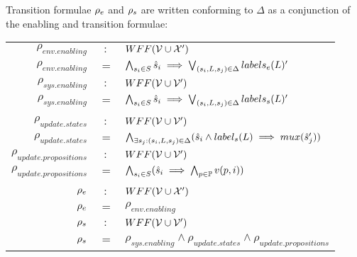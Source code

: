 Transition formulae ${\rho_e}$ and ${\rho_s}$ are written conforming to $\Delta$ as a conjunction of the enabling and transition formulae:

\vspace{1em}
\begin{tabular}{ r c l }
	$\rho_{env.enabling}$&$:$&$WFF({\mathcal{V}} \cup {\ensuremath{\mathcal{X}}}')$\\
	$\rho_{env.enabling}$ &$=$& $\bigwedge_{s_i \in S} \hat{s}_{i} \implies \bigvee_{(s_i,L,s_j) \in \Delta}labels_e(L)'$\\
	$\rho_{sys.enabling}$&$:$&$WFF({\mathcal{V}} \cup {\ensuremath{\mathcal{V}}}')$\\
	$\rho_{sys.enabling}$ &$=$& $\bigwedge_{s_i \in S} \hat{s}_{i} \implies \bigvee_{(s_i,L,s_j) \in \Delta}labels_s(L)'$\\
	&&\\
	$\rho_{update.states}$&$:$&$WFF({\mathcal{V}} \cup {\ensuremath{\mathcal{V}}}')$\\
$\rho_{update.states}$&$=$&$\bigwedge_{\exists s_j:(s_i,L,s_j) \in \Delta} (\hat{s}_{i} \wedge label_s(L) \implies mux(\hat{s}_{j}') ) $\\	
	$\rho_{update.propositions}$&$:$&$WFF({\mathcal{V}} \cup {\ensuremath{\mathcal{V}}}')$\\
	$\rho_{update.propositions}$&$=$&$\bigwedge_{s_i \in S} (\hat{s}_{i} \implies \bigwedge_{p \in \mathbb{P}}v(p,i) )$\\
	&&\\
	${\rho_e}$&$:$&$WFF({\mathcal{V}} \cup {\ensuremath{\mathcal{X}}}')$\\
	${\rho_e}$&$=$&$\rho_{env.enabling}$\\		
	${\rho_s}$&$:$&$WFF({\mathcal{V}} \cup {\ensuremath{\mathcal{V}}}')$\\	
	${\rho_s}$&$=$&$\rho_{sys.enabling} \wedge  \rho_{update.states} \wedge  \rho_{update.propositions}$\\	
\end{tabular}
\vspace{1em}

